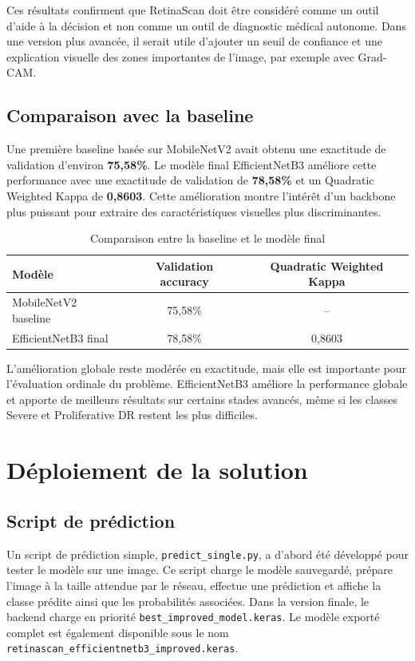 \documentclass[12pt,a4paper]{report}
\begin{document}
Ces résultats confirment que RetinaScan doit être considéré comme un outil d'aide à la décision et non comme un outil de diagnostic médical autonome. Dans une version plus avancée, il serait utile d'ajouter un seuil de confiance et une explication visuelle des zones importantes de l'image, par exemple avec Grad-CAM.

\section{Comparaison avec la baseline}
Une première baseline basée sur MobileNetV2 avait obtenu une exactitude de validation d'environ \textbf{75,58\%}. Le modèle final EfficientNetB3 améliore cette performance avec une exactitude de validation de \textbf{78,58\%} et un Quadratic Weighted Kappa de \textbf{0,8603}. Cette amélioration montre l'intérêt d'un backbone plus puissant pour extraire des caractéristiques visuelles plus discriminantes.

\begin{table}[H]
\centering
\caption{Comparaison entre la baseline et le modèle final}
\label{tab:baseline_comparison}
\begin{tabular}{lcc}
\toprule
Modèle & Validation accuracy & Quadratic Weighted Kappa \\
\midrule
MobileNetV2 baseline & 75,58\% & -- \\
EfficientNetB3 final & 78,58\% & 0,8603 \\
\bottomrule
\end{tabular}
\end{table}

L'amélioration globale reste modérée en exactitude, mais elle est importante pour l'évaluation ordinale du problème. EfficientNetB3 améliore la performance globale et apporte de meilleurs résultats sur certains stades avancés, même si les classes Severe et Proliferative DR restent les plus difficiles.

\chapter{Déploiement de la solution}

\section{Script de prédiction}
Un script de prédiction simple, \texttt{predict\_single.py}, a d'abord été développé pour tester le modèle sur une image. Ce script charge le modèle sauvegardé, prépare l'image à la taille attendue par le réseau, effectue une prédiction et affiche la classe prédite ainsi que les probabilités associées. Dans la version finale, le backend charge en priorité \texttt{best\_improved\_model.keras}. Le modèle exporté complet est également disponible sous le nom \texttt{retinascan\_efficientnetb3\_improved.keras}.
\end{document}
